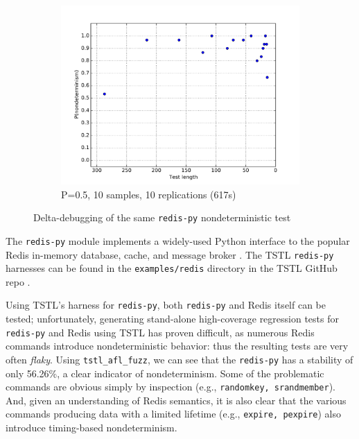 \begin{figure}
\begin{subfigure}{0.67\columnwidth}
\includegraphics[width=\columnwidth]{redisforceprep}
\caption{P=0.5, 10 samples, 10 replications (617s)}
\label{fig:r3}
\end{subfigure}
\caption{Delta-debugging of the same {\tt redis-py} nondeterministic test}
\end{figure}

The {\tt redis-py} \cite{redispy} module implements a widely-used Python interface
to the popular Redis in-memory database, cache, and
message broker \cite{redis}.  The TSTL {\tt redis-py} harnesses can be found in
the {\tt examples/redis} directory in the TSTL GitHub repo \cite{tstl}.

Using TSTL's harness for {\tt redis-py}, both {\tt redis-py} and Redis
itself can be tested; unfortunately, generating stand-alone
high-coverage regression tests for {\tt redis-py} and Redis using TSTL
has proven difficult, as numerous Redis commands introduce nondeterministic
behavior:  thus the resulting tests are very often \emph{flaky}.   Using {\tt tstl\_afl\_fuzz}, we can see that the {\tt redis-py} has a 
stability of only 56.26\%, a clear indicator of nondeterminism. Some
of the problematic commands are obvious simply by inspection (e.g.,
{\tt randomkey, srandmember}).  And, given an understanding of Redis
semantics, it is also clear that the various
commands producing data with a limited lifetime (e.g., {\tt expire,
  pexpire}) also introduce timing-based nondeterminism.


